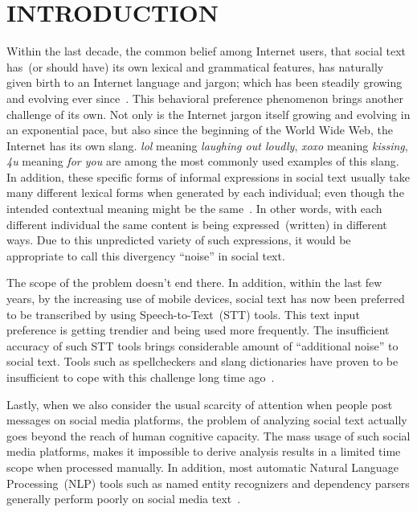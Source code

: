 \documentclass[a4paper,onesided,12pt]{report}
\begin{document}
\begin{abbreviations}
\end{abbreviations}


\chapter{INTRODUCTION}
\label{chapter:introduction}
Within the last decade, the common belief among Internet users, that social text has~(or should have) its own lexical and grammatical features, has naturally given birth to an Internet language and jargon; which has been steadily growing and evolving ever since~\cite{Choudhury:2007:IMS:1326044.1326048, eisenstein2013bad}. This behavioral preference phenomenon brings another challenge of its own. Not only is the Internet jargon itself growing and evolving in an exponential pace, but also since the beginning of the World Wide Web, the Internet has its own slang. \textit{lol} meaning \textit{laughing out loudly},  \textit{xoxo} meaning \textit{kissing}, \textit{4u} meaning \textit{for you} are among the most commonly used examples of this slang. In addition, these specific forms of informal expressions in social text usually take many different lexical forms when generated by each individual; even though the intended contextual meaning might be the same~\cite{eisenstein2013bad}. In other words, with each different individual the same content is being expressed~(written) in different ways. Due to this unpredicted variety of such expressions, it would be appropriate to call this divergency ``noise'' in social text.

The scope of the problem doesn't end there. In addition, within the last few years, by the increasing use of mobile devices, social text has now been preferred to be transcribed by using Speech-to-Text~(STT) tools. This text input preference is getting trendier and being used more frequently. The insufficient accuracy of such STT tools brings considerable amount of ``additional noise'' to social text. Tools such as spellcheckers and slang dictionaries have proven to be insufficient to cope with this challenge long time ago~\cite{sproat2001normalization}.

Lastly, when we also consider the usual scarcity of attention when people post messages on social media platforms, the problem of analyzing social text actually goes beyond the reach of human cognitive capacity. The mass usage of such social media platforms, makes it impossible to derive analysis results in a limited time scope when processed manually. In addition, most automatic Natural Language Processing~(NLP) tools such as named entity recognizers and  dependency parsers generally perform poorly on social media text~\cite{ritter2010unsupervised}.
\end{document}
